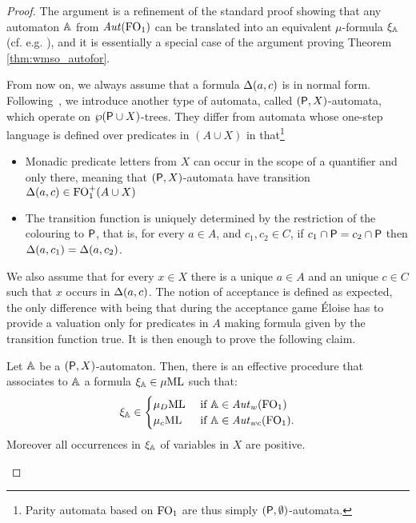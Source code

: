 \begin{proof}
The argument  is a refinement of the standard proof showing that any automaton 
$\mathbb{A}$ from $\mathit{Aut}(\mathrm{FO}_1)$ can be translated into an equivalent $\mu$-formula 
$\xi_\mathbb{A}$ (cf. e.g. \cite[Section 6]{Ven08}), and it is essentially a special case of the argument proving Theorem \ref{thm:wmso_autofor}.


From now on, we always assume that a formula $\Delta(a,c)$ is in normal form. 
Following~\cite{Ven08}, we introduce another type of automata, called $(\mathsf{P},X)$-automata, which operate on $\wp{(\mathsf{P}\cup X)}$-trees.
They differ from automata whose one-step language is defined over predicates in $(A \cup X)$ in that\footnote{Parity automata based on $\mathrm{FO}_1$ are thus simply $(\mathsf{P},\emptyset)$-automata.}
\begin{itemize}
\item Monadic predicate letters from $X$ can occur in the scope of a %
quantifier and only there, meaning that $(\mathsf{P},X)$-automata have transition 
$\Delta(a,c) \in \mathrm{FO}_1^+(A\cup X)$
%
\item 
The transition function is uniquely determined by the restriction of the 
colouring to $\mathsf{P}$, that is, for every $a \in A$, and $c_1, c_2 \in C$, if $c_1 \cap \mathsf{P} = c_2 \cap \mathsf{P}$ then $\Delta(a, c_1)= \Delta(a, c_2)$.
\end{itemize}
We also assume that
for every $x \in X$ there is a unique $a \in A$ and an unique $c \in C$ such that $x$ occurs in $\Delta(a,c)$.
The notion of acceptance is defined as expected, the only difference with being that during the acceptance game \'Eloise has to provide a valuation only for predicates in $A$ making formula given by the transition function true. It is then enough to prove the following claim.
\begin{claimfirst}\label{c:1}
Let $\mathbb{A}$ be a $(\mathsf{P},X)$-automaton. Then, there is an effective procedure that associates to $\mathbb{A}$ a formula $\xi_\mathbb{A} \in \mu\mathrm{ML}$ such that:
\begin{equation}\label{eq:c1}
\xi_\aut \in 
\begin{cases}\AFMC &\text{ if }\aut \in \AutW(\ofo) \\
\contAFMC &\text{ if }\aut \in \AutWC(\ofo) 
.
\end{cases}\end{equation}
Moreover all occurrences in $\xi_\mathbb{A}$ of variables in $X$ are positive.
\end{claimfirst}
\begin{pfclaim} %



\end{pfclaim}
\end{proof}
